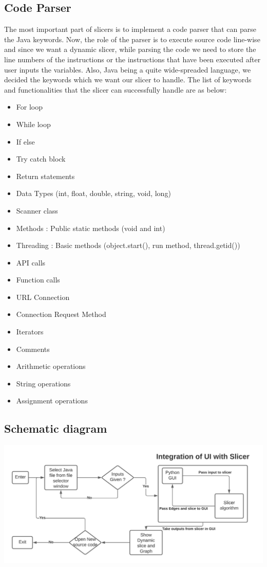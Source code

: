 \documentclass[conference]{IEEEtran}
\begin{document}
\subsection{Code Parser}
The most important part of slicers is to implement a code parser that can parse the Java keywords. Now, the role of the parser is to execute source code line-wise and since we want a dynamic slicer, while parsing the code we need to store the line numbers of the instructions or the instructions that have been executed after user inputs the variables. Also, Java being a quite wide-spreaded language, we decided the keywords which we want our slicer to handle. The list of keywords and functionalities that the slicer can successfully handle are as below:
\begin{itemize}
    \item For loop
    \item While loop
\item If else
 \item Try catch block
 \item Return statements
 \item Data Types (int, float, double, string, void, long)
 \item Scanner class
 \item Methods : Public static methods (void and int)
 \item Threading : Basic methods (object.start(), run method, thread.getid())
 \item API calls
 \item Function calls
 \item URL Connection
 \item Connection Request Method
 \item Iterators
 \item Comments
 \item Arithmetic operations
 \item String operations
 \item Assignment operations
\end{itemize}
\subsection{Schematic diagram}
\includegraphics[scale=0.4]{Blank diagram (1).jpeg}\\
\end{document}
